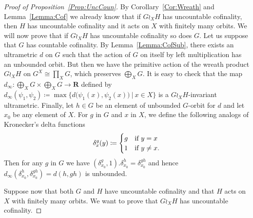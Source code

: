 \documentclass[a4paper]{article}
\theoremstyle{definition}
\newcommand*{\field}[1]{\mathbf{#1}}
\newcommand*{\R}{\field{R}}
\newcommand{\setst}[2]{\{#1\ |\ #2\}}
\begin{document}
%
%
\begin{proof}[Proof of Proposition~\ref{Prop:UncCoun}]
By Corollary~\ref{Cor:Wreath} and Lemma~\ref{Lemma:Cof} we already know that if $G \wr_X H$ has uncountable cofinality, then $H$ has uncountable cofinality and it acts on $X$ with finitely many orbits.
We will now prove that if $G \wr_X H$ has uncountable cofinality so does $G$.
Let us suppose that $G$ has countable cofinality. By Lemma~\ref{Lemma:CofSub}, there exists an ultrametric $d$ on $G$ such that the action of $G$ on itself by left multiplication has an unbounded orbit.
But then we have the primitive action of the wreath product $G\wr_XH$ on $G^X\cong\prod_XG$, which preserves $\bigoplus_XG$.
It is easy to check that the map $d_\infty\colon\bigoplus_XG\times\bigoplus_XG\to\R$ defined by $d_\infty(\psi_1,\psi_2)\coloneqq\max\setst{d\bigl(\psi_1(x),\psi_2(x)\bigr)}{x\in X}$ is a $G\wr_XH$-invariant ultrametric.
Finally, let $h\in G$ be an element of unbounded $G$-orbit for $d$ and let $x_0$ be any element of $X$.
For $g$ in $G$ and $x$ in $X$, we define the following analogs of Kronecker's delta functions
\begin{equation*}
\delta_x^g (y) \coloneqq
\begin{cases}
g & \textnormal{if }y = x \\
1 & \textnormal{if } y \neq x.
\end{cases}
\end{equation*}
Then for any $g$ in $G$ we have $(\delta_{x_0}^g,1).\delta_{x_0}^h=\delta_{x_0}^{gh}$ and hence $d_\infty(\delta_{x_0}^h,\delta_{x_0}^{gh})=d(h,gh)$ is unbounded.

Suppose now that both $G$ and $H$ have uncountable cofinality and that $H$ acts on $X$ with finitely many orbits. We want to prove that $G\wr_XH$ has uncountable cofinality.


\end{proof}
\end{document}
